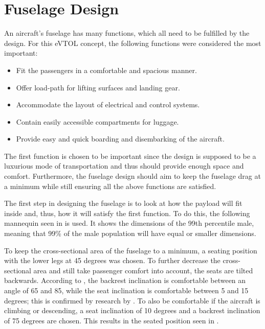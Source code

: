 \section{Fuselage Design}
\label{sec:fuselage_design}
An aircraft’s fuselage has many functions, which all need to be fulfilled by the design.
For this eVTOL concept, the following functions were considered the most important:
\begin{itemize}
    \item Fit the passengers in a comfortable and spacious manner.
    \item Offer load-path for lifting surfaces and landing gear.
    \item Accommodate the layout of electrical and control systems.
    \item Contain easily accessible compartments for luggage. 
    \item Provide easy and quick boarding and disembarking of the aircraft.
\end{itemize}
The first function is chosen to be important since the design is supposed to be a luxurious mode of transportation and thus should provide enough space and comfort.
Furthermore, the fuselage design should aim to keep the fuselage drag at a minimum while still ensuring all the above functions are satisfied.

The first step in designing the fuselage is to look at how the payload will fit inside and, thus, how it will satisfy the first function.
To do this, the following mannequin seen in  is used.
It shows the dimensions of the 99th percentile male, meaning that 99\% of the male population will have equal or smaller dimensions.

To keep the cross-sectional area of the fuselage to a minimum, a seating position with the lower legs at 45 degrees was chosen.
To further decrease the cross-sectional area and still take passenger comfort into account, the seats are tilted backwards.
According to \cite{goossens2000biomechanical}, the backrest inclination is comfortable between an angle of 65 and 85, while the seat inclination is comfortable between 5 and 15 degrees; this is confirmed by research by \cite{yao2023sitting}.
To also be comfortable if the aircraft is climbing or descending, a seat inclination of 10 degrees and a backrest inclination of 75 degrees are chosen.
This results in the seated position seen in .


